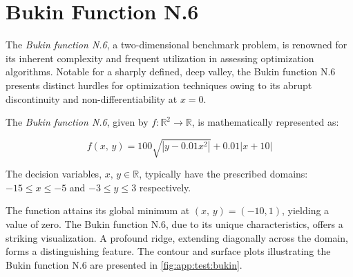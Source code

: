 \section{Bukin Function N.6}
\label{sec:app:test:bukin}

  The \emph{Bukin function N.6}, a two-dimensional benchmark problem, is
  renowned for its inherent complexity and frequent utilization in assessing
  optimization algorithms.
  Notable for a sharply defined, deep valley, the Bukin function N.6 presents 
  distinct hurdles for optimization techniques owing to its abrupt discontinuity
  and non-differentiability at \(x = 0\).

\begin{definition}
  \label{def:app:test:bukin}
  The \emph{Bukin function N.6}, given by \(f: \mathbb{R}^2 \rightarrow 
  \mathbb{R}\), is mathematically represented as:

  \begin{equation}
    \label{eq:app:test:bukin}
    f(x,\, y) = 100 \sqrt{|y - 0.01x^2|} + 0.01 |x + 10|
  \end{equation}
  
  The decision variables, \(x,\, y \in \mathbb{R}\), typically have the prescribed
  domains: \(-15 \leq x \leq -5\) and \(-3 \leq y \leq 3\) respectively.
\end{definition}

The function attains its global minimum at \((x,\, y) = (-10, 1)\), yielding a 
value of zero.
The Bukin function N.6, due to its unique characteristics, offers 
a striking visualization.
A profound ridge, extending diagonally across the domain, forms a distinguishing
feature.
The contour and surface plots illustrating the Bukin function N.6 are presented 
in \vref{fig:app:test:bukin}.

